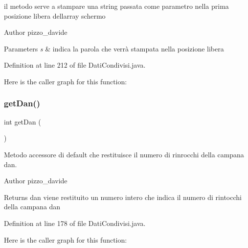 il metodo serve a stampare una string passata come parametro nella prima posizione libera dell\textquotesingle{}array \textquotesingle{}schermo\textquotesingle{} 

\begin{DoxyAuthor}{Author}
pizzo\+\_\+davide
\end{DoxyAuthor}

\begin{DoxyParams}{Parameters}
{\em s} & indica la parola che verrà stampata nella posizione libera \\
\hline
\end{DoxyParams}


Definition at line 212 of file Dati\+Condivisi.\+java.

Here is the caller graph for this function\+:
\mbox{\label{classcampane_1_1_dati_condivisi_a5575d5b4f01a453d789f4a41fa3b5ba0}} 
\subsubsection{\texorpdfstring{get\+Dan()}{getDan()}}
{\footnotesize\ttfamily int get\+Dan (\begin{DoxyParamCaption}{ }\end{DoxyParamCaption})}



Metodo accessore di default che restituisce il numero di rinrocchi della campana \textquotesingle{}dan\textquotesingle{}. 

\begin{DoxyAuthor}{Author}
pizzo\+\_\+davide
\end{DoxyAuthor}
\begin{DoxyReturn}{Returns}
dan viene restituito un numero intero che indica il numero di rintocchi della campana \textquotesingle{}dan\textquotesingle{} 
\end{DoxyReturn}


Definition at line 178 of file Dati\+Condivisi.\+java.

Here is the caller graph for this function\+:
\mbox{\label{classcampane_1_1_dati_condivisi_a7895c089a1adbd4cf6dda1d8b849596b}} 
